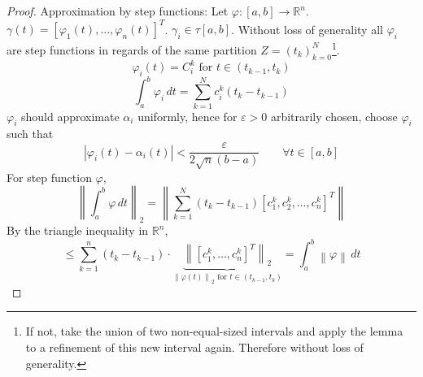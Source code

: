 \documentclass{article}
\newcommand{\norm}[1]{\left\|#1\right\|}
\newcommand{\card}[1]{\left|#1\right|}
\begin{document}
\begin{proof}
  Approximation by step functions: Let $\varphi: [a,b] \to \mathbb R^n$.
  $\gamma(t) = \left[\varphi_1(t), \dots, \varphi_n(t)\right]^T$.
  $\gamma_i \in \tau[a,b]$. Without loss of generality all $\varphi_i$ are step functions in regards of the same partition $Z = (t_k)_{k=0}^N$\footnote{If not, take the union of two non-equal-sized intervals and apply the lemma to a refinement of this new interval again. Therefore without loss of generality.}.
  \[ \varphi_i(t) = C_i^k \text{ for } t \in (t_{k-1}, t_k) \]
  \[ \int_a^b \varphi_i \, dt = \sum_{k=1}^N c_i^k (t_k - t_{k-1}) \]
  $\varphi_i$ should approximate $\alpha_i$ uniformly, hence for $\varepsilon > 0$ arbitrarily chosen, choose $\varphi_i$ such that
  \[ \card{\varphi_i(t) - \alpha_i(t)} < \frac{\varepsilon}{2 \sqrt n (b - a)} \qquad \forall t \in [a,b] \]
  For step function $\varphi$,
  \[ \norm{\int_a^b \varphi \, dt}_2 = \norm{\sum_{k=1}^N (t_k - t_{k-1}) \left[c_1^k, c_2^k, \dots, c_n^k\right]^T} \]
  By the triangle inequality in $\mathbb R^n$,
  \[ \leq \sum_{k=1}^n (t_k - t_{k-1}) \cdot \underbrace{\norm{\left[c_1^k, \dots, c_n^k\right]^T}_2}_{\norm{\varphi(t)}_2 \text{ for } t \in (t_{k-1}, t_k)} = \int_a^b \norm{\varphi} \, dt \]
\end{proof}

\printindex
\end{document}
